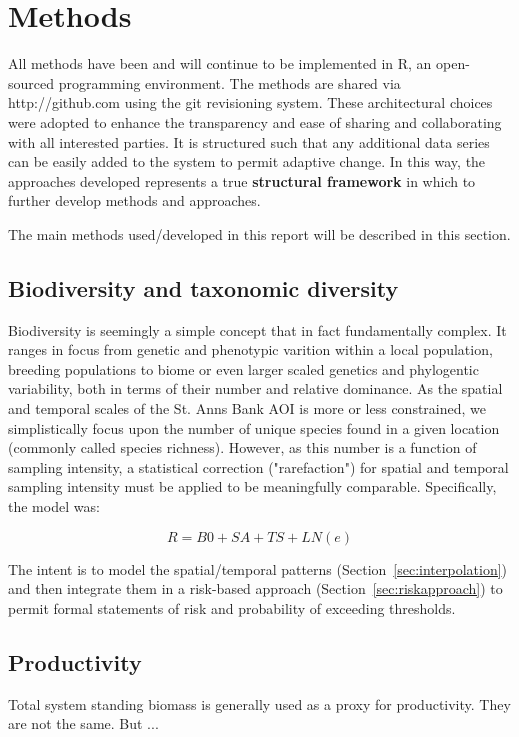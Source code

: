 \documentclass[letterpaper,portrait,11pt]{scrartcl}
\numberwithin{equation}{section}		%
\numberwithin{figure}{section}		%
\numberwithin{table}{section}				%
\begin{document}
\clearpage
\section{Methods}

All methods have been and will continue to be implemented in R, an open-sourced programming environment. The methods are shared via http://github.com using the git revisioning system. These architectural choices were adopted to enhance the transparency and ease of sharing and collaborating with all interested parties. It is structured such that any additional data series can be easily added to the system to permit adaptive change. In this way, the approaches developed represents a true \textbf{structural framework} in which to further develop methods and approaches. 

The main methods used/developed in this report will be described in this section.


\subsection{Biodiversity and taxonomic diversity}


Biodiversity is seemingly a simple concept that in fact fundamentally complex. It ranges in focus from genetic and phenotypic varition within a local population, breeding populations to biome or even larger scaled genetics and phylogentic variability, both in terms of their number and relative dominance. As the spatial and temporal scales of the St. Anns Bank AOI is more or less constrained, we simplistically focus upon the number of unique species found in a given location (commonly called species richness). However, as this number is a function of sampling intensity, a statistical correction ("rarefaction") for spatial and temporal sampling intensity must be applied to be meaningfully comparable. Specifically, the model was:

\[
R = B0 + SA + TS + LN(e)
\]

The intent is to model the spatial/temporal patterns (Section~\ref{sec:interpolation}) and then integrate them in a risk-based approach (Section~\ref{sec:riskapproach}) to permit formal statements of risk and probability of exceeding thresholds. 

\clearpage
\subsection{Productivity}

Total system standing biomass is generally used as a proxy for productivity. They are not the same. But ...
\end{document}

